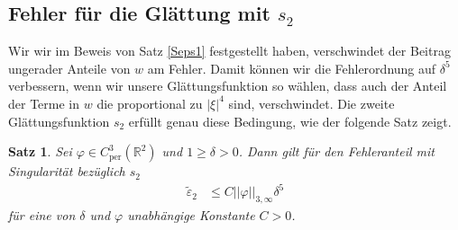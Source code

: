 \documentclass[12pt,a4paper]{scrartcl}
\newtheorem{Satz}{Satz}[section]
\numberwithin{equation}{section}
\newcommand{\R}{\mathbb{R}} %
\newcommand{\per}{\operatorname{per}}
\begin{document}
\subsection{Fehler für die Glättung mit $s_2$}
Wir wir im Beweis von Satz \ref{Seps1} festgestellt haben, verschwindet der Beitrag ungerader Anteile von $w$ am Fehler. Damit können wir die Fehlerordnung auf $\delta^5$ verbessern, wenn wir unsere Glättungsfunktion so wählen, dass auch der Anteil der Terme in $w$ die proportional zu $|\xi|^4$ sind, verschwindet. Die zweite Glättungsfunktion $s_2$ erfüllt genau diese Bedingung, wie der folgende Satz zeigt. 
\begin{Satz} \label{Seps2}
Sei $\varphi \in C_{\per}^3(\R^2)$ und $1\geq\delta >0$. Dann gilt für den Fehleranteil mit Singularität bezüglich $s_2$
\begin{align*}
\widetilde \varepsilon_2 &\leq C ||\varphi||_{3,\infty} \delta^5
\end{align*}
für eine von $\delta$ und $\varphi$ unabhängige  Konstante $C>0$.
\end{Satz}     
\end{document}
